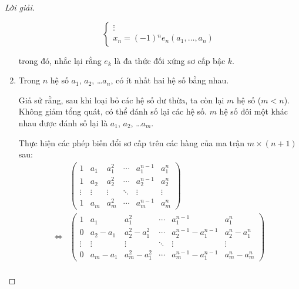 \documentclass[class=nhvh-linear-algebra,crop=false]{standalone}
\begin{document}
\begin{proof}[Lời giải]
\begin{enumerate}[label = \textbf{Trường hợp \arabic*.},itemindent=2cm]
\[\begin{cases}
				      \vdots                                      \\
				      x_{n} = (-1){}^{n}e_{n}(a_{1},\ldots,a_{n})
			      \end{cases}
		      \]
		      \par trong đó, nhắc lại rằng $e_{k}$ là đa thức đối xứng sơ cấp bậc $k$.
		\item Trong $n$ hệ số $a_{1}$, $a_{2}$, \ldots $a_{n}$, có ít nhất hai hệ số bằng nhau.
		      \par Giả sử rằng, sau khi loại bỏ các hệ số dư thừa, ta còn lại $m$ hệ số ($m < n$). Không giảm tổng quát, có thể đánh số lại các hệ số. $m$ hệ số đôi một khác nhau được đánh số lại là $a_{1}$, $a_{2}$, \ldots $a_{m}$.
		      \par Thực hiện các phép biến đổi sơ cấp trên các hàng của ma trận $m\times(n+1)$ sau:
		      \begingroup{}
		      \allowdisplaybreaks{}
		      \begin{align*}
			                          &
			      \begin{pmatrix}
				      1      & a_{1}  & a_{1}^{2} & \cdots & a_{1}^{n-1} & a_{1}^{n} \\
				      1      & a_{2}  & a_{2}^{2} & \cdots & a_{2}^{n-1} & a_{2}^{n} \\
				      \vdots & \vdots & \vdots    & \ddots & \vdots      & \vdots    \\
				      1      & a_{m}  & a_{m}^{2} & \cdots & a_{m}^{n-1} & a_{m}^{n}
			      \end{pmatrix}                                                                                                                         \\
			      \Longleftrightarrow &
			      \begin{pmatrix}
				      1      & a_{1}         & a_{1}^{2}             & \cdots & a_{1}^{n-1}               & a_{1}^{n}             \\
				      0      & a_{2} - a_{1} & a_{2}^{2} - a_{1}^{2} & \cdots & a_{2}^{n-1} - a_{1}^{n-1} & a_{2}^{n} - a_{1}^{n} \\
				      \vdots & \vdots        & \vdots                & \ddots & \vdots                    & \vdots                \\
				      0      & a_{m} - a_{1} & a_{m}^{2} - a_{1}^{2} & \cdots & a_{m}^{n-1} - a_{1}^{n-1} & a_{m}^{n} - a_{m}^{n}
			      \end{pmatrix}                                                                            \\

\end{align*}
\end{enumerate}
\end{proof}
\end{document}

